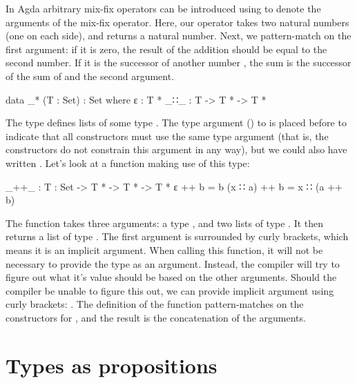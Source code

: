 		In Agda arbitrary mix-fix operators can be introduced using \codett{\_}
		to denote the arguments of the mix-fix operator. Here, our operator
		\codett{\_+\_} takes two natural numbers (one on each side), and
		returns a natural number. Next, we pattern-match on the first argument:
		if it is zero, the result of the addition should be equal to the second
		number. If it is the successor of another number , the sum is
		the successor of the sum of  and the second argument.

		\begin{code}
			data _* (T : Set) : Set where
			  ε : T *
			  _∷_ : T -> T * -> T *
		\end{code}

		The type \codett{\_*} defines lists of some type . The type
		argument () to \codett{\_*} is placed before \codett{:}
		to indicate that all constructors must use the same type argument (that
		is, the constructors do not constrain this argument in any way), but we
		could also have written . Let's look
		at a function making use of this type:

		\begin{code}
			_++_ : {T : Set} -> T * -> T * -> T *
			ε ++ b = b
			(x ∷ a) ++ b = x ∷ (a ++ b)
		\end{code}

		The function \codett{\_++\_} takes three arguments: a type ,
		and two lists of type . It then returns a list of type
		. The first argument is surrounded by curly brackets, which
		means it is an implicit argument. When calling this function, it will
		not be necessary to provide the type as an argument. Instead, the
		compiler will try to figure out what it's value should be based on the
		other arguments. Should the compiler be unable to figure this out, we
		can provide implicit argument using curly brackets: . The definition of the function pattern-matches on the
		constructors for , and the result is the concatenation of
		the arguments.

%

	\section{Types as propositions}

